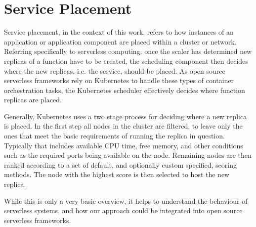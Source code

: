 \section{Service Placement}
Service placement, in the context of this work, refers to how instances of an application or application component are placed within a cluster or network.
Referring specifically to serverless computing, once the scaler has determined new replicas of a function have to be created, the scheduling component then decides where the new replicas, i.e. the service, should be placed.
As open source serverless frameworks rely on Kubernetes to handle these types of container orchestration tasks\cite{mohantyEvaluationOpenSource2018}, the Kubernetes scheduler effectively decides where function replicas are placed.

Generally, Kubernetes uses a two stage process for deciding where a new replica is placed.
In the first step all nodes in the cluster are filtered, to leave only the ones that meet the basic requirements of running the replica in question.
Typically that includes available CPU time, free memory, and other conditions such as the required ports being available on the node.
Remaining nodes are then ranked according to a set of default, and optionally custom specified, scoring methods.
The node with the highest score is then selected to host the new replica.

While this is only a very basic overview, it helps to understand the behaviour of serverless systems, and how our approach could be integrated into open source serverless frameworks.
